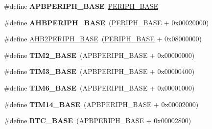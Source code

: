 \begin{DoxyCompactItemize}
\#define {\bfseries A\+P\+B\+P\+E\+R\+I\+P\+H\+\_\+\+B\+A\+SE}~\hyperlink{group___peripheral__memory__map_ga9171f49478fa86d932f89e78e73b88b0}{P\+E\+R\+I\+P\+H\+\_\+\+B\+A\+SE}
\item 
\mbox{\label{group___peripheral__memory__map_ga92eb5d49730765d2abd0f5b09548f9f5}} 
\#define {\bfseries A\+H\+B\+P\+E\+R\+I\+P\+H\+\_\+\+B\+A\+SE}~(\hyperlink{group___peripheral__memory__map_ga9171f49478fa86d932f89e78e73b88b0}{P\+E\+R\+I\+P\+H\+\_\+\+B\+A\+SE} + 0x00020000)
\item 
\#define \hyperlink{group___peripheral__memory__map_gaeedaa71d22a1948492365e2cd26cfd46}{A\+H\+B2\+P\+E\+R\+I\+P\+H\+\_\+\+B\+A\+SE}~(\hyperlink{group___peripheral__memory__map_ga9171f49478fa86d932f89e78e73b88b0}{P\+E\+R\+I\+P\+H\+\_\+\+B\+A\+SE} + 0x08000000)
\item 
\mbox{\label{group___peripheral__memory__map_ga00d0fe6ad532ab32f0f81cafca8d3aa5}} 
\#define {\bfseries T\+I\+M2\+\_\+\+B\+A\+SE}~(A\+P\+B\+P\+E\+R\+I\+P\+H\+\_\+\+B\+A\+SE + 0x00000000)
\item 
\mbox{\label{group___peripheral__memory__map_gaf0c34a518f87e1e505cd2332e989564a}} 
\#define {\bfseries T\+I\+M3\+\_\+\+B\+A\+SE}~(A\+P\+B\+P\+E\+R\+I\+P\+H\+\_\+\+B\+A\+SE + 0x00000400)
\item 
\mbox{\label{group___peripheral__memory__map_ga8268ec947929f192559f28c6bf7d1eac}} 
\#define {\bfseries T\+I\+M6\+\_\+\+B\+A\+SE}~(A\+P\+B\+P\+E\+R\+I\+P\+H\+\_\+\+B\+A\+SE + 0x00001000)
\item 
\mbox{\label{group___peripheral__memory__map_ga862855347d6e1d92730dfe17ee8e90b8}} 
\#define {\bfseries T\+I\+M14\+\_\+\+B\+A\+SE}~(A\+P\+B\+P\+E\+R\+I\+P\+H\+\_\+\+B\+A\+SE + 0x00002000)
\item 
\mbox{\label{group___peripheral__memory__map_ga4265e665d56225412e57a61d87417022}} 
\#define {\bfseries R\+T\+C\+\_\+\+B\+A\+SE}~(A\+P\+B\+P\+E\+R\+I\+P\+H\+\_\+\+B\+A\+SE + 0x00002800)
\item 
\mbox{\label{group___peripheral__memory__map_ga9a5bf4728ab93dea5b569f5b972cbe62}} 

\end{DoxyCompactItemize}
